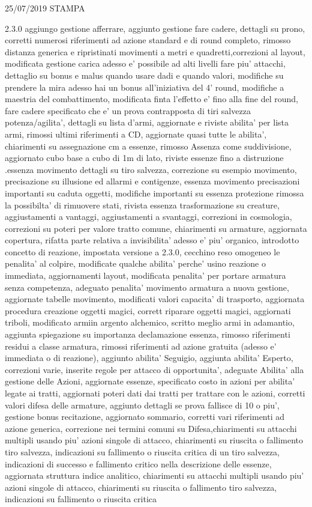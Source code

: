 \documentclass[a4paper,11pt,twoside,openany]{book}
\begin{document}
{{25/07/2019 STAMPA

2.3.0 aggiungo gestione afferrare, aggiunto gestione fare cadere, dettagli su prono, corretti numerosi riferimenti ad azione standard e di round completo, rimosso distanza generica e ripristinati movimenti a metri e quadretti,correzioni al layout, modificata gestione carica adesso e' possibile ad alti livelli fare piu' attacchi, dettaglio su bonus e malus quando usare dadi e quando valori, modifiche su prendere la mira adesso hai un bonus all'iniziativa del 4' round, modifiche a maestria del combattimento, modificata finta l'effetto e' fino alla fine del round, fare cadere specificato che e' un prova contrapposta di tiri salvezza potenza/agilita', dettagli su lista d'armi, aggiornate e riviste abilita' per lista armi, rimossi ultimi riferimenti a CD, aggiornate quasi tutte le abilita', chiarimenti su assegnazione cm a essenze, rimosso Assenza come suddivisione, aggiornato cubo base a cubo di 1m di lato, riviste essenze fino a distruzione .essenza movimento dettagli su tiro salvezza, correzione su esempio movimento, precisazione su illusione ed allarmi e contigenze, essenza movimento precisazioni importanti su caduta oggetti, modifiche importanti su essenza protezione rimossa la possibilta' di rimuovere stati, rivista essenza trasformazione su creature, aggiustamenti a vantaggi, aggiustamenti a svantaggi, correzioni in cosmologia, correzioni su poteri per valore tratto comune, chiarimenti su armature, aggiornata copertura, rifatta parte relativa a invisibilita' adesso e' piu' organico, introdotto concetto di reazione, impostata versione a 2.3.0, cecchino reso omogeneo le penalita' al colpire, modificate qualche abilita' perche' usino reazione o immediata, aggiornamenti layout, modificata penalita' per portare armatura senza competenza, adeguato penalita' movimento armatura a nuova gestione, aggiornate tabelle movimento, modificati valori capacita' di trasporto, aggiornata procedura creazione oggetti magici, corrett riparare oggetti magici, aggiornati triboli, modificato armiin argento alchemico, scritto meglio armi in adamantio, aggiunta spiegazione su importanza declamazione essenza, rimosso riferimenti residui a classe armatura, rimossi riferimenti ad azione gratuita (adesso e' immediata o di reazione), aggiunto abilita' Seguigio, aggiunta abilita' Esperto, correzioni varie, inserite regole per attacco di opportunita', adeguate Abilita' alla gestione delle Azioni, aggiornate essenze, specificato costo in azioni per abilita' legate ai tratti, aggiornati poteri dati dai tratti per trattare con le azioni, corretti valori difesa delle armature, aggiunto dettagli se prova fallisce di 10 o piu', gestione bonus recitazione, aggiornato sommario, corretti vari riferimenti ad azione generica, correzione nei termini comuni su Difesa,chiarimenti su attacchi multipli usando piu' azioni singole di attacco, chiarimenti su riuscita o fallimento tiro salvezza, indicazioni su fallimento o riuscita critica di un tiro salvezza, indicazioni di successo e fallimento critico nella descrizione delle essenze, aggiornata struttura indice analitico, chiarimenti su attacchi multipli usando piu' azioni singole di attacco, chiarimenti su riuscita o fallimento tiro salvezza, indicazioni su fallimento o riuscita critica }}
\end{document}
